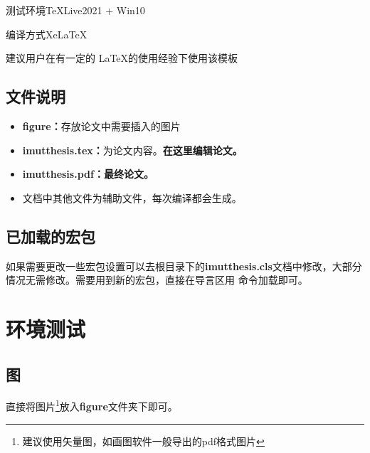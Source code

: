 \documentclass{imutthesis}
\begin{document}
测试环境\TeX Live2021 + Win10

编译方式Xe\LaTeX

{\color{red}建议用户在有一定的 \LaTeX 的使用经验下使用该模板}

\section{文件说明\label{sec:sample}}
\begin{itemize}
	     \item \textbf{figure：}存放论文中需要插入的图片
		\item \textbf{imutthesis.tex：}为论文内容。{\color{red}\textbf{在这里编辑论文。}}
		\item \textbf{imutthesis.pdf：}{\color{red}\textbf{最终论文。}}
		\item 文档中其他文件为辅助文件，每次编译都会生成。
\end{itemize}

\section{已加载的宏包}
\begin{table}[H]
	\centering
	\caption{宏包目录}	
\end{table}
如果需要更改一些宏包设置可以去根目录下的\textbf{imutthesis.cls}文档中修改，大部分情况无需修改。需要用到新的宏包，直接在导言区用 \myverb{\usepackage{...}} 命令加载即可。

\chapter{环境测试}

\section{图}
直接将图片\footnote{建议使用矢量图，如画图软件一般导出的pdf格式图片}放入\textbf{figure}文件夹下即可。
\end{document}
